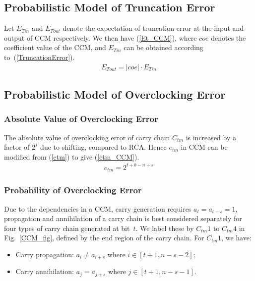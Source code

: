 \documentclass[prodmode,acmtrets]{acmsmall} %
\begin{document}
\subsection{Probabilistic Model of Truncation Error}
Let $E_{Tin}$ and $E_{Tout}$ denote the expectation of truncation error at the input and output of CCM respectively. We then have (\ref{Et_CCM}), where $coe$ denotes the coefficient value of the CCM, and $E_{Tin}$ can be obtained according to~(\ref{TruncationError}).
%
\begin{eqnarray}\label{Et_CCM}
  E_{Tout}=|coe|\cdot E_{Tin}
\end{eqnarray}

\subsection{Probabilistic Model of Overclocking Error}
\subsubsection{Absolute Value of Overclocking Error}
The absolute value of overclocking error of carry chain $C_{tm}$ is increased by a factor of $2^s$ due to shifting, compared to RCA. Hence $e_{tm}$ in CCM can be modified from (\ref{etm}) to give (\ref{etm_CCM}).
%
\begin{eqnarray}\label{etm_CCM}
  e_{tm}=2^{t+b-n+s}
\end{eqnarray}

\subsubsection{Probability of Overclocking Error}
Due to the dependencies in a CCM, carry generation requires $a_t=a_{t-s}=1$, propagation and annihilation of a carry chain is best considered separately for four types of carry chain generated at bit~$t$. We label these by $C_{tm}1$ to $C_{tm}4$ in Fig.~\ref{CCM_fig}, defined by the end region of the carry chain. For $C_{tm}1$, we have:

\begin{itemize}
  \item Carry propagation: $a_i\neq a_{i+s}$ where $i\in[t+1,n-s-2]$;
  \item Carry annihilation: $a_j=a_{j+s}$ where $j\in[t+1,n-s-1]$.
\end{itemize}
\end{document}
